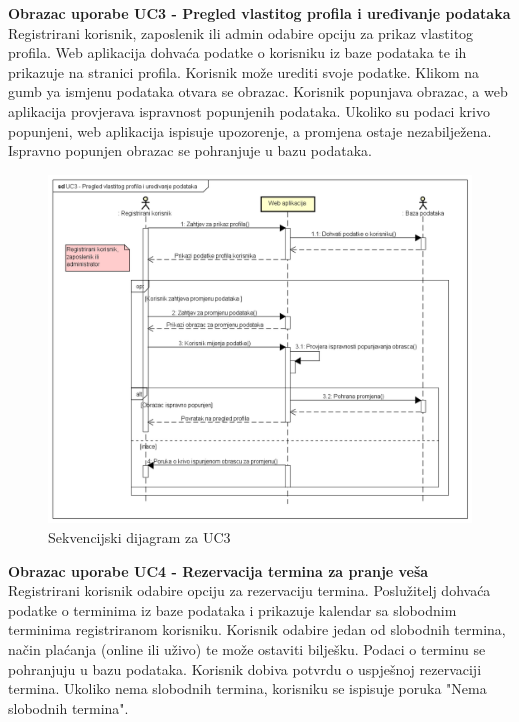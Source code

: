 \textbf{Obrazac uporabe UC3 - Pregled vlastitog profila i uređivanje podataka}\\

{Registrirani korisnik, zaposlenik ili admin odabire opciju za prikaz vlastitog profila. Web aplikacija dohvaća podatke o korisniku iz baze podataka te ih prikazuje na stranici profila. Korisnik može urediti svoje podatke. Klikom na gumb ya ismjenu podataka otvara se obrazac. Korisnik popunjava obrazac, a web aplikacija provjerava ispravnost popunjenih podataka. Ukoliko su podaci krivo popunjeni, web aplikacija ispisuje upozorenje, a promjena ostaje nezabilježena. Ispravno popunjen obrazac se pohranjuje u bazu podataka. }


\begin{figure}[H]
	\includegraphics[scale=0.5]{slike/UC3_Pregled_vlastitog_profila.PNG} %
	\centering
	\caption{Sekvencijski dijagram za UC3}
	\label{fig:promjene}
\end{figure}
\eject

\textbf{Obrazac uporabe UC4 - Rezervacija termina za pranje veša}\\

{Registrirani korisnik odabire opciju za rezervaciju termina. Poslužitelj dohvaća podatke o terminima iz baze podataka i prikazuje kalendar sa slobodnim terminima registriranom korisniku. Korisnik odabire jedan od slobodnih termina, način plaćanja (online ili uživo) te može ostaviti bilješku. Podaci o terminu se pohranjuju u bazu podataka. Korisnik dobiva potvrdu o uspješnoj rezervaciji termina. Ukoliko nema slobodnih termina, korisniku se ispisuje poruka "Nema slobodnih termina".}


